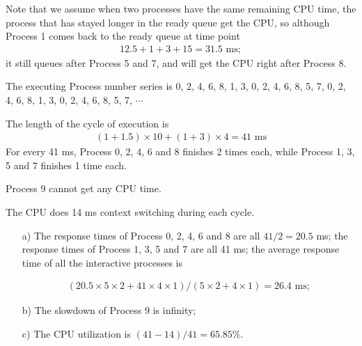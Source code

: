 \documentclass[12pt,letterpaper]{article}
\begin{document}
Note that we assume when two processes have the same remaining CPU time, the process that has stayed longer in the ready queue get the CPU, so although Process 1 comes back to the ready queue at time point
\begin{eqnarray}
12.5+1+3+15=31.5\textrm{ ms};
\end{eqnarray}
it still queues after Process 5 and 7, and will get the CPU right after Process 8.

The executing Process number series is 0, 2, 4, 6, 8, 1, 3, 0, 2, 4, 6, 8, 5, 7, 0, 2, 4, 6, 8, 1, 3, 0, 2, 4, 6, 8, 5, 7, $\cdots$

The length of the cycle of execution is 
\begin{eqnarray}
(1+1.5)\times10+(1+3)\times4=41\textrm{ ms}
\end{eqnarray}
For every 41 ms, Process 0, 2, 4, 6 and 8 finishes 2 times each, while Process 1, 3, 5 and 7 finishes 1 time each.

Process 9 cannot get any CPU time.

The CPU does 14 ms context switching during each cycle.

\begin{enumerate}
\item[a)] The response times of Process 0, 2, 4, 6 and 8 are all $41/2=20.5$ ms; the response times of Process 1, 3, 5 and 7 are all 41 ms; the average response time of all the interactive processes is 

\begin{eqnarray}
(20.5\times5\times2+41\times4\times1)/(5\times2+4\times1)=26.4\textrm{ ms};
\end{eqnarray}

\item[b)] The slowdown of Process 9 is infinity;
\item[c)] The CPU utilization is $(41-14)/41=65.85\%$.
\end{enumerate}
\end{document}
